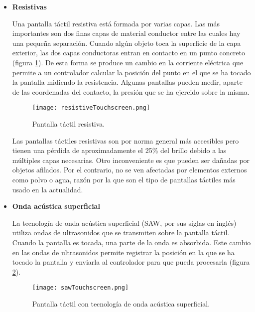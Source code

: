 \begin{itemize}
\item \textbf{Resistivas}

Una pantalla táctil resistiva está formada por varias capas. Las más 
importantes son dos finas capas de material conductor entre las cuales hay una 
pequeña separación. Cuando algún objeto toca la superficie de la capa exterior, 
las dos capas conductoras entran en contacto en un punto concreto
(figura \ref{fig:resistiveTouchscreen}). De esta forma se produce un cambio en 
la corriente eléctrica que permite a un controlador calcular la posición del 
punto en el que se ha tocado la pantalla midiendo la resistencia. Algunas 
pantallas pueden medir, aparte de las coordenadas del contacto, la presión que 
se ha ejercido sobre la misma.

  \begin{figure}[H]
    \begin{center}
      \texttt{[image: resistiveTouchscreen.png]}
      \caption{Pantalla táctil resistiva.}
      \label{fig:resistiveTouchscreen}
    \end{center}
  \end{figure}

Las pantallas táctiles resistivas son por norma general más accesibles pero 
tienen una pérdida de aproximadamente el 25\% del brillo debido a las múltiples 
capas necesarias. Otro inconveniente es que pueden ser dañadas por 
objetos afilados. Por el contrario, no se ven afectadas por elementos externos 
como polvo o agua, razón por la que son el tipo de pantallas táctiles más usado 
en la actualidad.

\item \textbf{Onda acústica superficial}

La tecnología de onda acústica superficial (\acs{SAW}, por sus siglas en 
inglés) utiliza ondas de ultrasonidos que se transmiten sobre la pantalla 
táctil. Cuando la pantalla es tocada, una parte de la onda es absorbida. Este 
cambio en las ondas de ultrasonidos permite registrar la posición en la que se 
ha tocado la pantalla y enviarla al controlador para que pueda procesarla
(figura \ref{fig:sawTouchscreen}).

  \begin{figure}[H]
    \begin{center}
      \texttt{[image: sawTouchscreen.png]}
      \caption{Pantalla táctil con tecnología de onda acústica
      superficial.}
      \label{fig:sawTouchscreen}
    \end{center}
  \end{figure}


\end{itemize}
